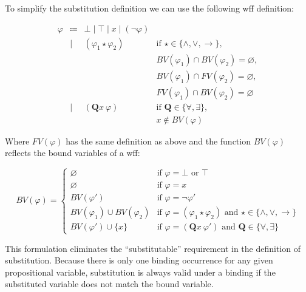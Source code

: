 \documentclass[12pt,leqno]{article}
\begin{document}
\newpage
To simplify the substitution definition we can use the following wff
definition:

\[
  \begin{array}{lcll}
  \varphi & \Coloneqq & \bot \mid \top \mid x \mid (\lnot \varphi) & \\
    & \mid & (\varphi_1 \star \varphi_2)
      & \text{if $\star \in \{\land, \lor, \to\}$}, \\
    &&& BV(\varphi_1) \cap BV(\varphi_2) = \varnothing, \\
    &&& BV(\varphi_1) \cap FV(\varphi_2) = \varnothing, \\
    &&& FV(\varphi_1) \cap BV(\varphi_2) = \varnothing \\
    & \mid & (\mathbf{Q}x\ \varphi)
      & \text{if $\mathbf{Q} \in \{\forall, \exists\}$,} \\
    &&& x \notin BV(\varphi)
  \end{array}
\]

Where $FV(\varphi)$ has the same definition as above and the function
$BV(\varphi)$ reflects the bound variables of a wff:

\[
  BV(\varphi) = \left\{
    \begin{array}{ll}
    \varnothing  & \text{if $\varphi = \bot$ or $\top$} \\
    \varnothing  & \text{if $\varphi = x$} \\
    BV(\varphi') & \text{if $\varphi = \lnot\varphi'$} \\
    BV(\varphi_1) \cup BV(\varphi_2) &
      \text{if $\varphi = (\varphi_1 \star \varphi_2)$ and
        $\star \in \{\land, \lor, \to\}$} \\
    BV(\varphi') \cup \{x\} &
      \text{if $\varphi = (\mathbf{Q}x\ \varphi')$ and
        $\mathbf{Q} \in \{\forall, \exists\}$}
    \end{array}
  \right.
\]

This formulation eliminates the ``substitutable'' requirement in the
definition of substitution. Because there is only one binding occurrence for
any given propositional variable, substitution is always valid under a binding
if the substituted variable does not match the bound variable.
\end{document}
